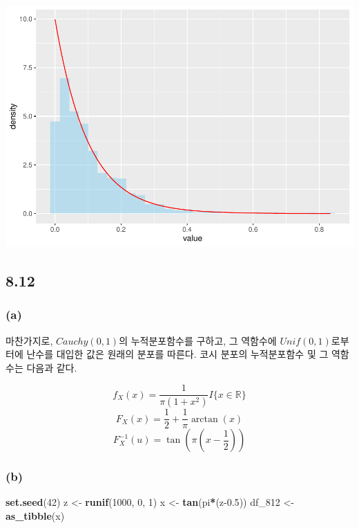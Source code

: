 \documentclass[
]{article}
\newenvironment{Shaded}{\begin{snugshade}}{\end{snugshade}}
\newcommand{\DecValTok}[1]{\textcolor[rgb]{0.00,0.00,0.81}{#1}}
\newcommand{\FloatTok}[1]{\textcolor[rgb]{0.00,0.00,0.81}{#1}}
\newcommand{\FunctionTok}[1]{\textcolor[rgb]{0.13,0.29,0.53}{\textbf{#1}}}
\newcommand{\NormalTok}[1]{#1}
\newcommand{\OtherTok}[1]{\textcolor[rgb]{0.56,0.35,0.01}{#1}}
\newcommand{\SpecialCharTok}[1]{\textcolor[rgb]{0.81,0.36,0.00}{\textbf{#1}}}
\begin{document}
\includegraphics{Bayes_stat_hw2_files/figure-latex/unnamed-chunk-9-1.pdf}

\subsection{8.12}\label{section-5}

\subsubsection{(a)}\label{a-1}

마찬가지로, \(Cauchy(0, 1)\)의 누적분포함수를 구하고, 그 역함수에
\(Unif(0, 1)\)로부터에 난수를 대입한 값은 원래의 분포를 따른다. 코시
분포의 누적분포함수 및 그 역함수는 다음과 같다.

\[
f_X(x) = \frac{1}{\pi(1+x^2)} I\{x \in \mathbb{R}\}
\] \[
F_X(x) = \frac{1}{2} + \frac{1}{\pi} \arctan(x)
\] \[
F_X^{-1}(u) = \tan(\pi(x - \frac{1}{2}))
\]

\subsubsection{(b)}\label{b-1}

\begin{Shaded}
\begin{Highlighting}[]
\FunctionTok{set.seed}\NormalTok{(}\DecValTok{42}\NormalTok{)}
\NormalTok{z }\OtherTok{\textless{}{-}} \FunctionTok{runif}\NormalTok{(}\DecValTok{1000}\NormalTok{, }\DecValTok{0}\NormalTok{, }\DecValTok{1}\NormalTok{)}
\NormalTok{x }\OtherTok{\textless{}{-}} \FunctionTok{tan}\NormalTok{(pi}\SpecialCharTok{*}\NormalTok{(z}\FloatTok{{-}0.5}\NormalTok{))}
\NormalTok{df\_812 }\OtherTok{\textless{}{-}} \FunctionTok{as\_tibble}\NormalTok{(x)}
\end{Highlighting}
\end{Shaded}
\end{document}
